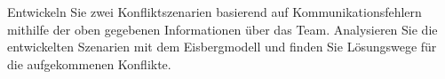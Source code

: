 \documentclass[a4paper]{article}
\begin{document}
\begin{flushleft}
Entwickeln Sie zwei Konfliktszenarien basierend auf Kommunikationsfehlern mithilfe der oben gegebenen Informationen über das Team.\newline \newline
Analysieren Sie die entwickelten Szenarien mit dem Eisbergmodell und finden Sie Lösungswege für die aufgekommenen Konflikte.
\end{flushleft}
\end{document}
